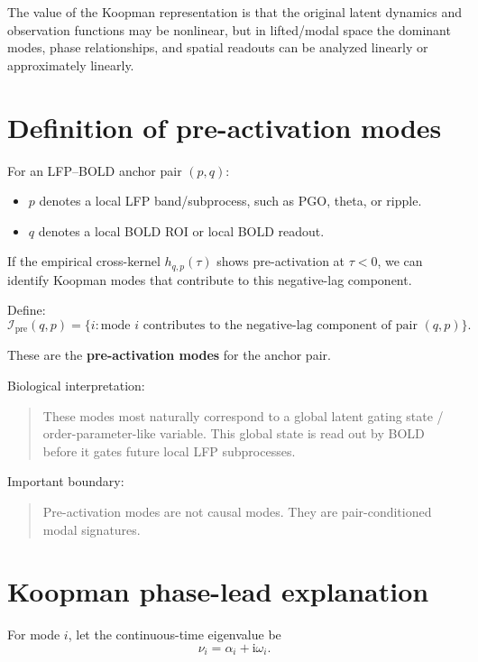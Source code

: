 \documentclass[11pt,a4paper]{article}
\begin{document}
The value of the Koopman representation is that the original latent dynamics and observation functions may be nonlinear, but in lifted/modal space the dominant modes, phase relationships, and spatial readouts can be analyzed linearly or approximately linearly.

\section{Definition of pre-activation modes}

For an LFP--BOLD anchor pair $(p,q)$:
\begin{itemize}
    \item $p$ denotes a local LFP band/subprocess, such as PGO, theta, or ripple.
    \item $q$ denotes a local BOLD ROI or local BOLD readout.
\end{itemize}

If the empirical cross-kernel $h_{q,p}(\tau)$ shows pre-activation at $\tau<0$, we can identify Koopman modes that contribute to this negative-lag component.

Define:
\begin{equation}
\mathcal I_{\mathrm{pre}}(q,p)
=
\{i: \text{mode } i \text{ contributes to the negative-lag component of pair }(q,p)\}.
\end{equation}

These are the \textbf{pre-activation modes} for the anchor pair.

Biological interpretation:
\begin{quote}
These modes most naturally correspond to a global latent gating state / order-parameter-like variable. This global state is read out by BOLD before it gates future local LFP subprocesses.
\end{quote}

Important boundary:
\begin{quote}
Pre-activation modes are not causal modes. They are pair-conditioned modal signatures.
\end{quote}

\section{Koopman phase-lead explanation}

For mode $i$, let the continuous-time eigenvalue be
\begin{equation}
    \nu_i = \alpha_i + \mathrm{i}\omega_i.
\end{equation}
\end{document}
